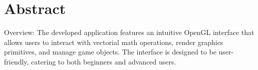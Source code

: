 \chapter*{Abstract} 

Overview: The developed application features an intuitive OpenGL interface that
allows users to interact with vectorial math operations, render graphics
primitives, and manage game objects. The interface is designed to be
user-friendly, catering to both beginners and advanced users.




